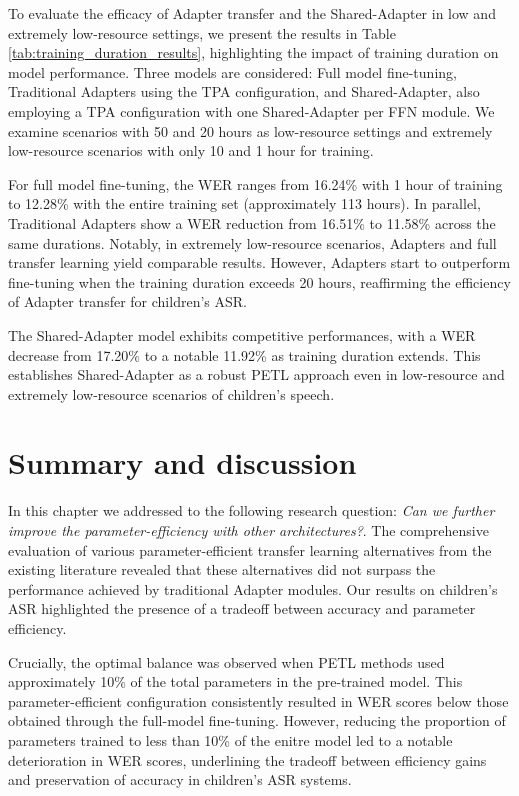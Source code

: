 To evaluate the efficacy of Adapter transfer and the Shared-Adapter in low and extremely low-resource settings, we present the results in Table \ref{tab:training_duration_results}, highlighting the impact of training duration on model performance. Three models are considered: Full model fine-tuning, Traditional Adapters using the \ac{TPA} configuration, and Shared-Adapter, also employing a \ac{TPA} configuration with one Shared-Adapter per \ac{FFN} module. We examine scenarios with 50 and 20 hours as low-resource settings and extremely low-resource scenarios with only 10 and 1 hour for training.

For full model fine-tuning, the \ac{WER} ranges from 16.24\% with 1 hour of training to 12.28\% with the entire training set (approximately 113 hours). In parallel, Traditional Adapters show a \ac{WER} reduction from 16.51\% to 11.58\% across the same durations. Notably, in extremely low-resource scenarios, Adapters and full transfer learning yield comparable results. However, Adapters start to outperform fine-tuning when the training duration exceeds 20 hours, reaffirming the efficiency of Adapter transfer for children's \ac{ASR}.

The Shared-Adapter model exhibits competitive performances, with a \ac{WER} decrease from 17.20\% to a notable 11.92\% as training duration extends. This establishes Shared-Adapter as a robust \ac{PETL} approach even in low-resource and extremely low-resource scenarios of children's speech.

\section{Summary and discussion}
In this chapter we addressed to the following research question: \textit{Can we further improve the parameter-efficiency with other architectures?}. The comprehensive evaluation of various parameter-efficient transfer learning alternatives from the existing literature revealed that these alternatives did not surpass the performance achieved by traditional Adapter modules. Our results on children's \ac{ASR} highlighted the presence of a tradeoff between accuracy and parameter efficiency.

Crucially, the optimal balance was observed when \ac{PETL} methods used approximately 10\% of the total parameters in the pre-trained model. This parameter-efficient configuration consistently resulted in \ac{WER} scores below those obtained through the full-model fine-tuning. However, reducing the proportion of parameters trained to less than 10\% of the enitre model led to a notable deterioration in \ac{WER} scores, underlining the tradeoff between efficiency gains and preservation of accuracy in children's \ac{ASR} systems.



